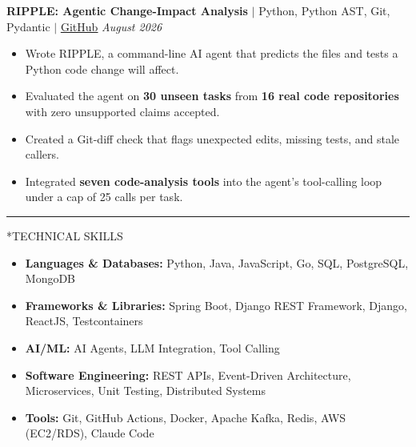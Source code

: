 \documentclass[10pt, letterpaper]{article}
\makeatletter
\newcommand{\sectiondivider}{\vspace{0.62em}\hrule\vspace{0.54em}}
\newcommand{\rolegap}{\vspace{6.6pt}}
\renewcommand{\section}{\@startsection{section}{1}{\z@}{-0.46em \@plus -0.1ex \@minus -0.1ex}{0.36ex \@plus 0.1ex}{\normalfont\large\bfseries}}
\makeatother
\begin{document}
\rolegap
\noindent\textbf{RIPPLE: Agentic Change-Impact Analysis} $|$ Python, Python AST, Git, Pydantic $|$ \href{https://github.com/Jaypath456/ripple}{\underline{GitHub}} \hfill \textit{August 2026}
\begin{itemize}\setlength{\itemsep}{0.78pt}
\item Wrote RIPPLE, a command-line AI agent that predicts the files and tests a Python code change will affect.
\item Evaluated the agent on \textbf{30 unseen tasks} from \textbf{16 real code repositories} with zero unsupported claims accepted.
\item Created a Git-diff check that flags unexpected edits, missing tests, and stale callers.
\item Integrated \textbf{seven code-analysis tools} into the agent's tool-calling loop under a cap of 25 calls per task.
\end{itemize}
\sectiondivider
\section*{TECHNICAL SKILLS}
\begin{itemize}\setlength{\itemsep}{0.78pt}
\item \textbf{Languages \& Databases:} Python, Java, JavaScript, Go, SQL, PostgreSQL, MongoDB
\item \textbf{Frameworks \& Libraries:} Spring Boot, Django REST Framework, Django, ReactJS, Testcontainers
\item \textbf{AI/ML:} AI Agents, LLM Integration, Tool Calling
\item \textbf{Software Engineering:} REST APIs, Event-Driven Architecture, Microservices, Unit Testing, Distributed Systems
\item \textbf{Tools:} Git, GitHub Actions, Docker, Apache Kafka, Redis, AWS (EC2/RDS), Claude Code
\end{itemize}
\end{document}
